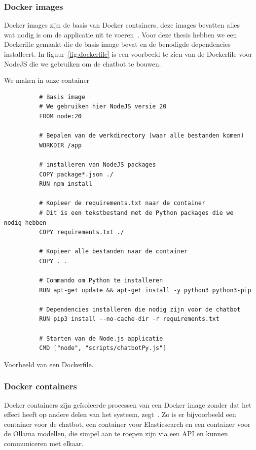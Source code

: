\subsubsection{Docker images}
Docker images zijn de basis van Docker containers, deze images bevatten alles wat nodig is om de applicatie uit te voeren~\autocite{Schmitt2024}.
Voor deze thesis hebben we een Dockerfile gemaakt die de basis image bevat en de benodigde dependencies installeert.
In figuur~\ref{fig:dockerfile} is een voorbeeld te zien van de Dockerfile voor NodeJS die we gebruiken om de chatbot te bouwen.

We maken in onze container

\begin{listing}[H]
     \begin{verbatim}
          # Basis image
          # We gebruiken hier NodeJS versie 20
          FROM node:20

          # Bepalen van de werkdirectory (waar alle bestanden komen)
          WORKDIR /app

          # installeren van NodeJS packages
          COPY package*.json ./
          RUN npm install

          # Kopieer de requirements.txt naar de container
          # Dit is een tekstbestand met de Python packages die we nodig hebben
          COPY requirements.txt ./

          # Kopieer alle bestanden naar de container
          COPY . .

          # Commando om Python te installeren
          RUN apt-get update && apt-get install -y python3 python3-pip

          # Dependencies installeren die nodig zijn voor de chatbot
          RUN pip3 install --no-cache-dir -r requirements.txt

          # Starten van de Node.js applicatie
          CMD ["node", "scripts/chatbotPy.js"]
     \end{verbatim}
     \caption[Voorbeeld Dockerfile]{\label{fig:dockerfile}Voorbeeld van een Dockerfile.}
\end{listing}

\subsubsection{Docker containers}
Docker containers zijn geïsoleerde processen van een Docker image zonder dat het effect heeft op andere delen van het systeem, zegt~\textcite{Schmitt2024}.
Zo is er bijvoorbeeld een container voor de chatbot, een container voor Elasticsearch en een container voor de Ollama modellen, die simpel aan te roepen zijn via een API en kunnen communiceren met elkaar.\@

